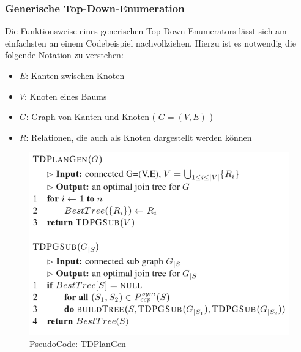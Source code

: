 \subsubsection{Generische Top-Down-Enumeration}

Die Funktionsweise eines generischen Top-Down-Enumerators lässt sich am einfachsten an einem Codebeispiel nachvollziehen. Hierzu ist es notwendig die folgende Notation  zu verstehen:

\begin{itemize}
\item $E$: Kanten zwischen Knoten
\item $V$: Knoten eines Baums
\item $G$: Graph von Kanten und Knoten ( $G = (V,E)$ )
\item $R$: Relationen, die auch als Knoten dargestellt werden können
\end{itemize}


\begin{figure}[ht]
  \centering
  \includegraphics[scale=0.4]{03_Regeln/00_media/TDPlanGen.png}
  \caption{PseudoCode: TDPlanGen}
  \label{TDPlanGen}
\end{figure}


